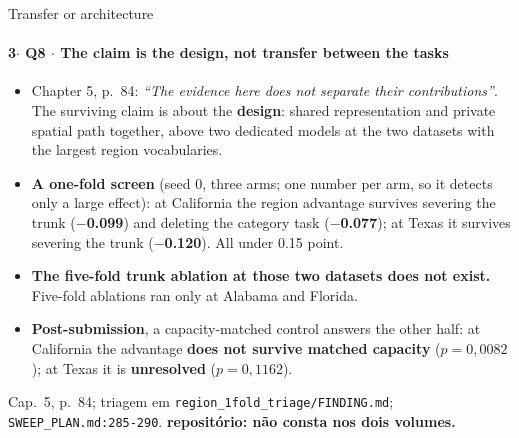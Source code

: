\documentclass{beamer}
\begin{document}
\begin{frame}[noframenumbering]{Transfer or architecture}
    \framesubtitle{\normalsize 3$\cdot$ \textbf{Q8} $\cdot$ The claim is the design, not transfer between the tasks}
    \hypertarget{q8}{}
    \small\begin{itemize}\setlength{\itemsep}{0pt}\setlength{\parskip}{0pt}
        \item Chapter 5, p.~84: \textit{``The evidence here does not separate their contributions''}. The surviving claim is about the \textbf{design}: shared representation and private spatial path together, above two dedicated models at the two datasets with the largest region vocabularies.
        \item \textbf{A one-fold screen} (seed 0, three arms; one number per arm, so it detects only a large effect): at California the region advantage survives severing the trunk (\textbf{$-$0.099}) and deleting the category task (\textbf{$-$0.077}); at Texas it survives severing the trunk (\textbf{$-$0.120}). All under 0.15 point.
        \item \textcolor{alert}{\textbf{The five-fold trunk ablation at those two datasets does not exist.}} Five-fold ablations ran only at Alabama and Florida.
        \item \textbf{Post-submission}, a capacity-matched control answers the other half: at California the advantage \textbf{does not survive matched capacity} ($p = 0{,}0082$); at Texas it is \textbf{unresolved} ($p = 0{,}1162$).
    \end{itemize}
    \vfill
    {\scriptsize
    \begin{minipage}[b]{0.775\linewidth}\raggedright\textcolor{black!70}{Cap.~5, p.~84; triagem em \texttt{region\_1fold\_triage/FINDING.md}; \texttt{SWEEP\_PLAN.md:285-290}. \textbf{repositório: não consta nos dois volumes.}}\end{minipage}\hfill
    \begin{minipage}[b]{0.20\linewidth}\raggedleft \hyperlink{bp1}{}\hyperlink{b0}{}\end{minipage}}
\end{frame}
\end{document}
